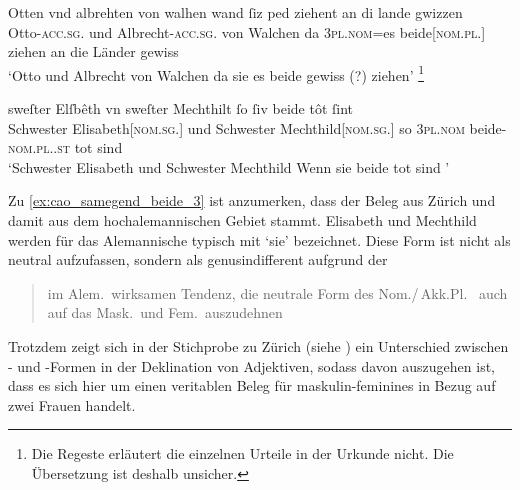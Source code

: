 \begin{exe}
\ex \label{ex:cao_samegend_beide}
\begin{xlist}

	\ex \label{ex:cao_samegend_beide_2}
		\gll Otten vnd albrehten von walhen \textelp{} wand
			ſiz ped ziehent an di lande gwizzen \\
			Otto-\textsc{acc.sg.\MascM} und Albrecht-\textsc{acc.sg.\MascM} von Walchen
			{} da \textsc{3pl\subM.nom}=es beide[\textsc{nom.pl.\MascM}] ziehen an die
			Länder gewiss \\
		\trans `Otto und Albrecht von Walchen \textelp{} da sie es beide
			gewiss (?)  ziehen'%
			\footnote{Die Regeste \autocite[80]{caor} erläutert die einzelnen
			Urteile in der Urkunde nicht. Die Übersetzung ist deshalb
			unsicher.}
			\parencites(Nr. 491, Salzburg, 1281)[431,41 und 432.38]{cao1}

	\ex \label{ex:cao_samegend_beide_3}
		\gll sweſter Elſbêth vn sweſter Mechthilt \textelp{} ſo
			ſiv beide tôt ſint \textelp{} \\
			Schwester Elisabeth[\textsc{nom.sg.\FemF}] und Schwester
			Mechthild[\textsc{nom.sg.\FemF}] {} so \textsc{3pl\subF.nom}
			beide-\textsc{nom.pl.\FemF.st} tot sind {} \\
		\trans `Schwester Elisabeth und Schwester Mechthild \textelp{}
			Wenn sie beide tot sind \textelp{}'
			\parencites(Nr.~1504, Zürich, 1291)[679,12--13]{cao2}
\end{xlist}
\end{exe}

Zu \cref{ex:cao_samegend_beide_3} ist anzumerken, dass der Beleg aus Zürich und
damit aus dem hochalemannischen Gebiet stammt. Elisabeth und Mechthild werden
für das Alemannische typisch mit  `sie' bezeichnet. Diese Form
ist nicht als neutral aufzufassen, sondern als genusindifferent aufgrund der
\blockcquote[395]{ksw2}{im Alem.\ wirksamen Tendenz, die neutrale Form
 des Nom./\,Akk.Pl.\ \textelp{} auch auf das Mask.\ und Fem.\
auszudehnen}. Trotzdem zeigt sich in der Stichprobe zu Zürich (siehe
\cpageref{par:adjzuerich}) ein Unterschied zwischen \norm{e}- und
\norm{iu}-Formen in der Deklination von Adjektiven, sodass davon auszugehen ist,
dass es sich hier um einen veritablen Beleg für maskulin-feminines \norm{bėide} in Bezug auf zwei
Frauen handelt.

